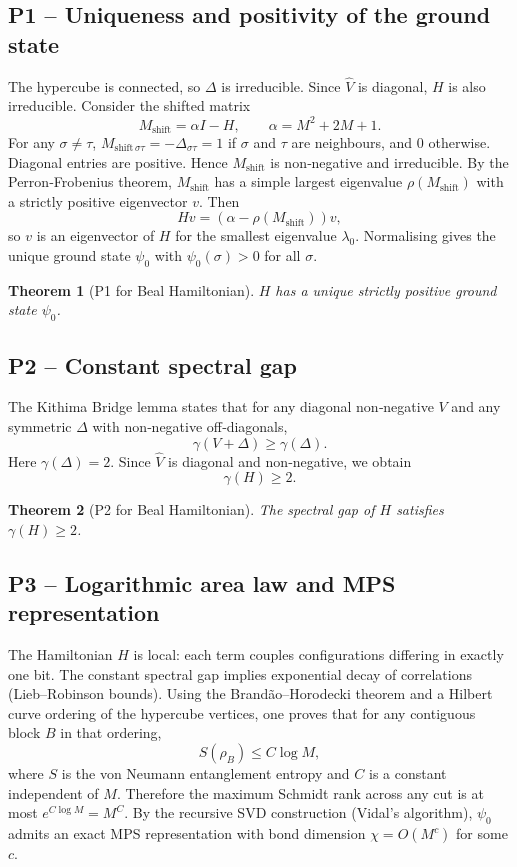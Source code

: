 \documentclass[11pt,a4paper]{article}
\newtheorem{theorem}{Theorem}[section]
\begin{document}
\subsection{P1 – Uniqueness and positivity of the ground state}

The hypercube is connected, so \(\Delta\) is irreducible. Since \(\hat{V}\) is diagonal, \(H\) is also irreducible. Consider the shifted matrix
\[
M_{\text{shift}} = \alpha I - H,\qquad \alpha = M^2 + 2M + 1.
\]
For any \(\sigma \neq \tau\), \(M_{\text{shift}\,\sigma\tau} = -\Delta_{\sigma\tau} = 1\) if \(\sigma\) and \(\tau\) are neighbours, and \(0\) otherwise. Diagonal entries are positive. Hence \(M_{\text{shift}}\) is non‑negative and irreducible. By the Perron‑Frobenius theorem, \(M_{\text{shift}}\) has a simple largest eigenvalue \(\rho(M_{\text{shift}})\) with a strictly positive eigenvector \(v\). Then
\[
H v = (\alpha - \rho(M_{\text{shift}})) v,
\]
so \(v\) is an eigenvector of \(H\) for the smallest eigenvalue \(\lambda_0\). Normalising gives the unique ground state \(\psi_0\) with \(\psi_0(\sigma) > 0\) for all \(\sigma\).

\begin{theorem}[P1 for Beal Hamiltonian]
\(H\) has a unique strictly positive ground state \(\psi_0\).
\end{theorem}

\subsection{P2 – Constant spectral gap}

The Kithima Bridge lemma states that for any diagonal non‑negative \(V\) and any symmetric \(\Delta\) with non‑negative off‑diagonals,
\[
\gamma(V + \Delta) \ge \gamma(\Delta).
\]
Here \(\gamma(\Delta) = 2\). Since \(\hat{V}\) is diagonal and non‑negative, we obtain
\[
\gamma(H) \ge 2.
\]

\begin{theorem}[P2 for Beal Hamiltonian]
The spectral gap of \(H\) satisfies \(\gamma(H) \ge 2\).
\end{theorem}

\subsection{P3 – Logarithmic area law and MPS representation}

The Hamiltonian \(H\) is local: each term couples configurations differing in exactly one bit. The constant spectral gap implies exponential decay of correlations (Lieb–Robinson bounds). Using the Brandão–Horodecki theorem and a Hilbert curve ordering of the hypercube vertices, one proves that for any contiguous block \(B\) in that ordering,
\[
S(\rho_B) \le C \log M,
\]
where \(S\) is the von Neumann entanglement entropy and \(C\) is a constant independent of \(M\). Therefore the maximum Schmidt rank across any cut is at most \(e^{C\log M} = M^{C}\). By the recursive SVD construction (Vidal's algorithm), \(\psi_0\) admits an exact MPS representation with bond dimension \(\chi = O(M^{c})\) for some \(c\).
\end{document}
